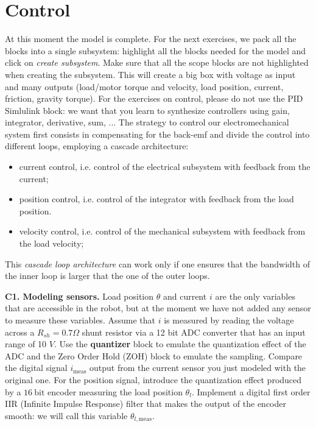 \documentclass[11pt]{article}
\begin{document}
\par
\section{Control}
\noindent At this moment the model is complete. For the next exercises, 
we pack all the blocks into a single subsystem: highlight all the blocks needed for the model 
and click on \emph{create subsystem}. Make sure that all the scope blocks are not highlighted when creating the subsystem.
This will create a big box with voltage as input and many outputs (load/motor torque and velocity, 
load position, current, friction, gravity torque). For the exercises on control, 
please do not use the PID Simlulink block: we want that you learn to synthesize controllers using gain, integrator, derivative, sum, ... 
The strategy to control our electromechanical system first consists in compensating for 
the back-emf and divide the control into different  loops, employing a cascade architecture:
\begin{itemize}
	\item current control, i.e. control of the electrical subsystem with feedback from the current;
	\item position control, i.e. control of the integrator with feedback from the load position.
    \item velocity control, i.e. control of the mechanical subsystem with feedback from the load velocity;
\end{itemize}

This \textit{cascade loop architecture} can work only if one ensures that 
the bandwidth of the inner loop is larger that the one of the outer loops.

\par
\textbf{C1. Modeling sensors.} 
Load position $\theta$ and  current $i$ are the only variables that are accessible in the robot, 
but at the moment we have not added any sensor to  measure these variables. 
Assume that $i$ is measured by reading the voltage across a $R_{sh} = 0.7 \Omega$ shunt resistor 
via a 12 bit ADC converter that has an input range of 10 $V$. Use the \textbf{quantizer}  
block to emulate the quantization effect of the ADC and the Zero Order Hold (ZOH) block to emulate the sampling. 
Compare the digital signal $i_{\mathrm{meas}}$ output from the  
current sensor you just modeled with the original one. 
For the position signal, introduce the quantization effect produced by a $16 \ \mathrm{bit}$ 
encoder measuring the load position $\theta_l$. Implement a digital first order 
IIR (Infinite Impulse Response)  filter that makes 
the output of the encoder smooth: we will call this variable $\theta_{l,\mathrm{meas}}$. 
\end{document}
